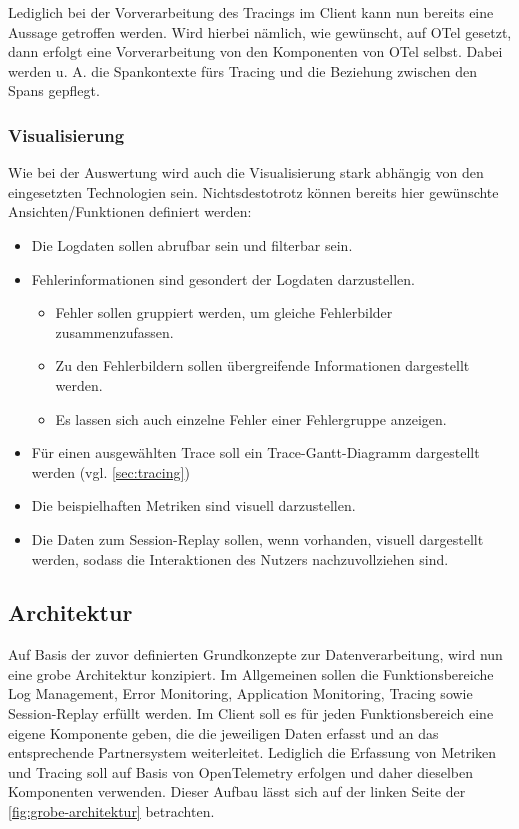 	Lediglich bei der Vorverarbeitung des Tracings im Client kann nun bereits eine Aussage getroffen werden. Wird hierbei nämlich, wie gewünscht, auf OTel gesetzt, dann erfolgt eine Vorverarbeitung von den Komponenten von OTel selbst. Dabei werden u. A. die Spankontexte fürs Tracing und die Beziehung zwischen den Spans gepflegt.
	
	\subsubsection{Visualisierung}
		
	Wie bei der Auswertung wird auch die Visualisierung stark abhängig von den eingesetzten Technologien sein. Nichtsdestotrotz können bereits hier gewünschte Ansichten/Funktionen definiert werden:
	
	\begin{itemize}
		\item Die Logdaten sollen abrufbar sein und filterbar sein.
		\item Fehlerinformationen sind gesondert der Logdaten darzustellen.
		\begin{itemize}
			\item Fehler sollen gruppiert werden, um gleiche Fehlerbilder zusammenzufassen.
			\item Zu den Fehlerbildern sollen übergreifende Informationen dargestellt werden.
			\item Es lassen sich auch einzelne Fehler einer Fehlergruppe anzeigen.
		\end{itemize}
		\item Für einen ausgewählten Trace soll ein Trace-Gantt-Diagramm dargestellt werden (vgl. \autoref{sec:tracing})
		\item Die beispielhaften Metriken sind visuell darzustellen.
		\item Die Daten zum Session-Replay sollen, wenn vorhanden, visuell dargestellt werden, sodass die Interaktionen des Nutzers nachzuvollziehen sind.
	\end{itemize}
	
	\subsection{Architektur}

	Auf Basis der zuvor definierten Grundkonzepte zur Datenverarbeitung, wird nun eine grobe Architektur konzipiert. Im Allgemeinen sollen die Funktionsbereiche Log Management, Error Monitoring, Application Monitoring, Tracing sowie Session-Replay erfüllt werden. Im Client soll es für jeden Funktionsbereich eine eigene Komponente geben, die die jeweiligen Daten erfasst und an das entsprechende Partnersystem weiterleitet. Lediglich die Erfassung von Metriken und Tracing soll auf Basis von OpenTelemetry erfolgen und daher dieselben Komponenten verwenden. Dieser Aufbau lässt sich auf der linken Seite der \autoref{fig:grobe-architektur} betrachten.
	
